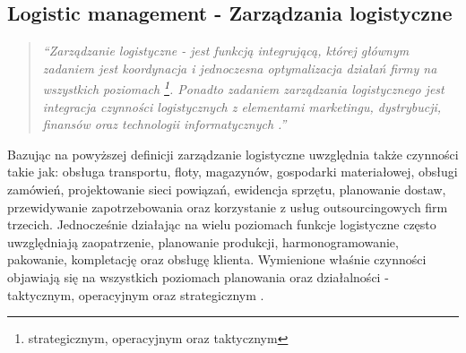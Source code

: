 	\subsection{Logistic management - Zarządzania logistyczne}
		\begin{quote}
			\textit{
				``\emph{Zarządzanie logistyczne} - jest funkcją integrującą, której głównym zadaniem jest
				koordynacja i jednoczesna optymalizacja działań firmy na wszystkich poziomach
				\footnote{strategicznym, operacyjnym oraz taktycznym}. Ponadto zadaniem \emph{zarządzania logistycznego} jest
				integracja czynności logistycznych z elementami marketingu, dystrybucji, finansów oraz technologii
				informatycznych \cite{csmp_logistic_management}.''
			}
		\end{quote}
		
		Bazując na powyższej definicji zarządzanie logistyczne uwzględnia także czynności takie jak:
		obsługa transportu, floty, magazynów, gospodarki materiałowej, obsługi zamówień, 
		projektowanie sieci powiązań, ewidencja sprzętu,
		planowanie dostaw, przewidywanie zapotrzebowania oraz korzystanie z 
		usług outsourcingowych firm trzecich. Jednocześnie dzia\-łając na wielu poziomach 
		funkcje logistyczne często uwzględniają zaopatrzenie, plano\-wanie produkcji, harmonogramowanie, 
		pakowanie, kompletację oraz obsługę klienta. Wymienione właśnie czynności
		objawiają się na wszystkich poziomach planowania oraz działalności - taktycznym, operacyjnym oraz
		strategicznym \cite{csmp_logistic_management}.

